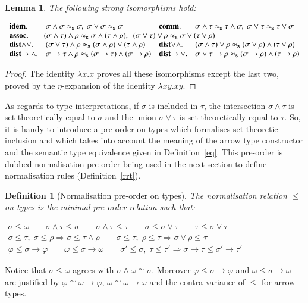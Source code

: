 \documentclass[UKenglish]{eptcs}
\newtheorem{lemma}[fact]{Lemma}
\newtheorem{definition}[fact]{Definition}
\newcommand{\tA}{\sigma}       \newcommand{\tB}{\tau}
\newcommand{\tC}{\rho}
\newcommand{\tu}{\omega}
\newcommand{\tS}{\sigma}       \newcommand{\tT}{\tau}
\newcommand{\tR}{\rho}
\newcommand{\labelx}[1]{\label{#1}}
\newcommand{\isos}{\approx_{\sf s}}
\newcommand{\myformula}[1]{\\[0.5pt]\centerline{#1}}
\newcommand{\esim}{\cong}
\begin{document}
  \begin{lemma}\labelx{arrowIso} The following strong isomorphisms hold:
\myformula{$\begin{array}{llll}
 \mbox{\rm{\bfseries idem}.}&  \tA \wedge \tA \isos \tA,\ \tA \vee \tA \isos \tA&
     \mbox{\rm{\bfseries comm}.}&  \tA \wedge \tB \isos \tB\wedge \tA,\ \tA \vee \tB \isos \tB\vee \tA\\
  \multicolumn{4}{l}{ \mbox{\rm{\bfseries assoc}.} \quad\quad (\tA \wedge \tB)\wedge \tC \isos \tA\wedge (\tB\wedge \tC),~~ (\tA \vee \tB)\vee \tC \isos \tA\vee (\tB\vee \tC)}\\
\mbox{\rm{\bfseries dist$\wedge\vee$}.}&   (\tA\vee \tB) \wedge \tC  \isos (\tA\wedge \tC)\vee (\tB \wedge \tC) &
\mbox{\rm{\bfseries dist$\vee\wedge$}.}& (\tA\wedge\tB)\vee\tC \isos (\tA\vee\tC)\wedge(\tB\vee\tC) \\
 \mbox{\rm{\bfseries dist$\to\wedge$}.}& \tA  \to \tB\wedge \tC \isos (\tA \to \tB)  \wedge (\tA \to \tC) &
    \mbox{\rm{\bfseries dist$\to\vee$}.}& \tA\vee \tB \to \tC \isos (\tA \to \tC)  \wedge (\tB \to \tC)
\end{array}$}
\end{lemma}
\begin{proof}
The identity $\lambda x.x$ proves all these isomorphisms except the last two, proved by the $\eta$-expansion of the identity $\lambda xy.xy$.
\end{proof}

As regards to type interpretations, if $\tA$ is included in $\tB$, the intersection $\tA\wedge\tB$ is set-theoretically equal to $\tA$ and the union $\tA\vee\tB$ is set-theoretically equal to $\tB$. So, it is handy to introduce a pre-order on types which formalises set-theoretic inclusion and which takes into account the meaning of the arrow type constructor and the semantic type equivalence given in Definition~\ref{eq}. This pre-order is dubbed normalisation pre-order being used in the next section to define normalisation rules (Definition~\ref{rrt}).
\begin{definition}[Normalisation pre-order on types]\labelx{pt}
The {\em normalisation relation $\leq$ on types} is the minimal pre-order relation such that:
\myformula{$\begin{array}{c}
\tS \leq  \omega  \quad \quad
 \tS \wedge  \tT \leq  \tS \quad \quad \tS \wedge  \tT \leq  \tT \quad \quad \tS \leq  \tS \vee  \tT \quad \quad \tT \leq  \tS \vee  \tT
   \\[1mm]
\tS \leq  \tT,\; \tS \leq  \tR \Rightarrow
              \tS  \leq  \tT \wedge  \tR \quad \quad \tS \leq  \tT,\; \tR \leq  \tT \Rightarrow
              \tS  \vee  \tR \leq  \tT
              \\[1mm]
\varphi\leq\tS\to\varphi \quad \quad \tu\leq\tS\to\tu\quad \quad \tS' \leq  \tS, \;  \tT \leq  \tT'
             \Rightarrow  \tS\to\tT  \leq  \tS'
             \to  \tT'
\end{array}$}
\end{definition}
Notice that $\tS \leq  \omega$ agrees with $\tS \wedge  \omega\esim\tS$. Moreover $\varphi\leq\tS\to\varphi$ and $\tu\leq\tS\to\tu$ are justified by $\varphi\esim\tu\to\varphi$, $\omega \esim \omega \to \omega$ and the contra-variance of $\leq$ for arrow types.
\end{document}
